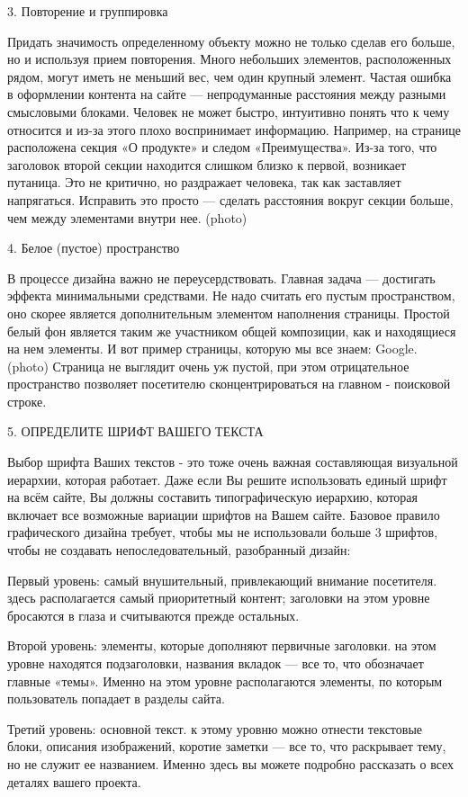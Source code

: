 \documentclass[10pt,twoside,slovak,a4paper]{article}
\begin{document}
3. Повторение и группировка

Придать значимость определенному объекту можно не только сделав его больше, но и используя прием повторения. Много небольших элементов, расположенных рядом, могут иметь не меньший вес, чем один крупный элемент. Частая ошибка в оформлении контента на сайте — непродуманные расстояния между разными смысловыми блоками. Человек не может быстро, интуитивно понять что к чему относится и из-за этого плохо воспринимает информацию. Например, на странице расположена секция «О продукте» и следом «Преимущества». Из-за того, что заголовок второй секции находится слишком близко к первой, возникает путаница. Это не критично, но раздражает человека, так как заставляет напрягаться. Исправить это просто — сделать расстояния вокруг секции больше, чем между элементами внутри нее. (photo)

4. Белое (пустое) пространство

В процессе дизайна важно не переусердствовать. Главная задача — достигать эффекта минимальными средствами. Не надо считать его пустым пространством, оно скорее является дополнительным элементом наполнения страницы. Простой белый фон является таким же участником общей композиции, как и находящиеся на нем элементы. И вот пример страницы, которую мы все знаем: Google. (photo) 
Страница не выглядит очень уж пустой, при этом отрицательное пространство позволяет посетителю сконцентрироваться на главном - поисковой строке. 

5. ОПРЕДЕЛИТЕ ШРИФТ ВАШЕГО ТЕКСТА

Выбор шрифта Ваших текстов - это тоже очень важная составляющая визуальной иерархии, которая работает. Даже если Вы решите использовать единый шрифт на всём сайте, Вы должны составить типографическую иерархию, которая включает все возможные вариации шрифтов на Вашем сайте. Базовое правило графического дизайна требует, чтобы мы не использовали больше 3 шрифтов, чтобы не создавать непоследовательный, разобранный дизайн:

Первый уровень: самый внушительный, привлекающий внимание посетителя.
здесь располагается самый приоритетный контент; заголовки на этом уровне бросаются в глаза и считываются прежде остальных.

Второй уровень: элементы, которые дополняют первичные заголовки.
на этом уровне находятся подзаголовки, названия вкладок — все то, что обозначает главные «темы». Именно на этом уровне располагаются элементы, по которым пользователь попадает в разделы сайта.

Третий уровень: основной текст. к этому уровню можно отнести текстовые блоки, описания изображений, коротие заметки — все то, что раскрывает тему, но не служит ее названием. Именно здесь вы можете подробно рассказать о всех деталях вашего проекта.
\end{document}
